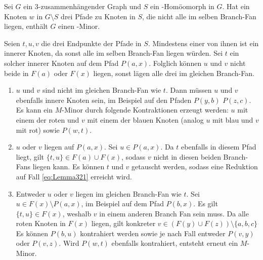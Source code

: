 \begin{lemma}\label{eq:Lemma32}
  Sei $G$ ein $3$-zusammenhängender Graph und $S$ ein \kdd-Homöomorph in $G$.
  Hat ein Knoten $w$ in $G \setminus S$ drei Pfade zu Knoten in $S$, die nicht alle im selben Branch-Fan liegen, enthält $G$ einen \kf-Minor.
\end{lemma}
\begin{beweis}
  Seien $t, u, v$ die drei Endpunkte der Pfade in $S$.
  Mindestens einer von ihnen ist ein innerer Knoten, da sonst alle im selben Branch-Fan liegen würden.
  Sei \oBdA $t$ ein solcher innerer Knoten auf dem Pfad $P(a, x)$.
  Folglich können $u$ und $v$ nicht beide in $F(a)$ oder $F(x)$ liegen, sonst lägen alle drei im gleichen Branch-Fan.
  \begin{enumerate}
    \item $u$ und $v$ sind nicht im gleichen Branch-Fan wie $t$. \label{eq:Lemma321}
          Dann müssen $u$ und $v$ ebenfalls innere Knoten sein, im Beispiel auf den Pfaden $P(y, b)$ \bzw $P(z, c)$.
          Es kann ein $M$-Minor durch folgende Kontraktionen erzeugt werden: $u$ mit einem der roten und $v$ mit einem der blauen Knoten (analog $u$ mit blau und $v$ mit rot) sowie $P(w, t)$.
    \item $u$ oder $v$ liegen auf $P(a, x)$. \label{eq:Lemma322}
          Sei \oBdA $u \in P(a, x)$.
          Da $t$ ebenfalls in diesem Pfad liegt, gilt $\{t, u\} \in F(a) \cup F(x)$, sodass $v$ nicht in diesen beiden Branch-Fans liegen kann.
          Es können $t$ und $v$ getauscht werden, sodass eine Reduktion auf Fall \ref{eq:Lemma321} erreicht wird.
    \item Entweder $u$ oder $v$ liegen im gleichen Branch-Fan wie $t$. \label{eq:Lemma323}
          Sei \oBdA $u \in F(x) \setminus P(a, x)$, im Beispiel auf dem Pfad $P(b, x)$.
          Es gilt $\{t, u\} \in F(x)$, weshalb $v$ in einem anderen Branch Fan sein muss.
          Da alle roten Knoten in $F(x)$ liegen, gilt konkreter $v \in (F(y) \cup F(z)) \setminus \{a, b, c\}$
          Es können $P(b, u)$ kontrahiert werden sowie je nach Fall entweder $P(v, y)$ oder $P(v, z)$.
          Wird $P(w, t)$ ebenfalls kontrahiert, entsteht erneut ein $M$-Minor.
  \end{enumerate}
\end{beweis}

